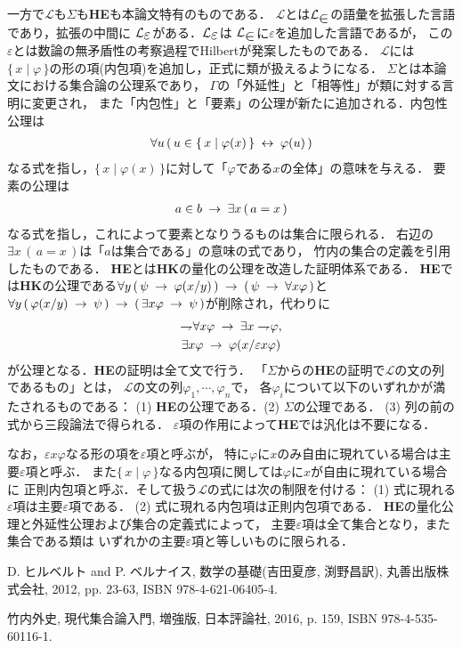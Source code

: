 \documentclass[twocolumn,10pt]{jsarticle}
\theoremstyle{mystyle}
\newcommand{\lang}[1]{\mathcal{L}_{\scalebox{1.2}{$#1$}}} %
\newcommand{\Set}[2]{\{\, #1 \mid #2\, \}} %
\newcommand{\negation}{\rightharpoondown\hspace{-0.25em}} %
\newcommand{\rarrow}{\hspace{0.25em}\rightarrow\hspace{0.25em}} %
\newcommand{\lrarrow}{\hspace{0.25em}\leftrightarrow\hspace{0.25em}} %
\begin{document}
	一方で$\mathcal{L}$も$\Sigma$も{\bf HE}も本論文特有のものである．
	$\mathcal{L}$とは$\lang{\in}$の語彙を拡張した言語であり，拡張の中間に
	$\lang{\varepsilon}$がある．$\lang{\varepsilon}$は
	$\lang{\in}$に$\varepsilon$を追加した言語であるが，
	この$\varepsilon$とは数論の無矛盾性の考察過程でHilbert\cite{Hilbert}が発案したものである．
	$\mathcal{L}$には$\Set{x}{\varphi}$の形の項(内包項)を追加し，正式に類が扱えるようになる．
	$\Sigma$とは本論文における集合論の公理系であり，
	$\Gamma$の「外延性」と「相等性」が類に対する言明に変更され，
	また「内包性」と「要素」の公理が新たに追加される．内包性公理は
	\begin{align}
		\forall u\, (\, u \in \Set{x}{\varphi(x)} \lrarrow \varphi(u)\, )
	\end{align}
	なる式を指し，$\Set{x}{\varphi(x)}$に対して「$\varphi$である$x$の全体」の意味を与える．
	要素の公理は
	\begin{align}
		a \in b \rarrow \exists x\, (\, a = x\, )
	\end{align}
	なる式を指し，これによって要素となりうるものは集合に限られる．
	右辺の$\exists x\, (\, a = x\, )$は「$a$は集合である」の意味の式であり，
	竹内\cite{TakeuchiSet}の集合の定義を引用したものである．
	{\bf HE}とは{\bf HK}の量化の公理を改造した証明体系である．
	{\bf HE}では{\bf HK}の公理である$\forall y\, (\, \psi \rarrow \varphi(x/y)\, )
	\rarrow (\, \psi \rarrow \forall x \varphi\, )$と
	$\forall y\, (\, \varphi(x/y) \rarrow \psi\, )
	\rarrow (\, \exists x \varphi \rarrow \psi\, )$が削除され，代わりに
	\begin{align}
		\begin{gathered}
			\negation \forall x \varphi \rarrow \exists x \negation \varphi, \\
			\exists x \varphi \rarrow \varphi(x/\varepsilon x \varphi)
		\end{gathered}
	\end{align}
	が公理となる．{\bf HE}の証明は全て文で行う．
	「$\Sigma$からの{\bf HE}の証明で$\mathcal{L}$の文の列であるもの」とは，
	$\mathcal{L}$の文の列$\varphi_{1},\cdots,\varphi_{n}$で，
	各$\varphi_{i}$について以下のいずれかが満たされるものである：
	(1) {\bf HE}の公理である．(2) $\Sigma$の公理である．
	(3) 列の前の式から三段論法で得られる．
	$\varepsilon$項の作用によって{\bf HE}では汎化は不要になる．
	
	なお，$\varepsilon x \varphi$なる形の項を$\varepsilon$項と呼ぶが，
	特に$\varphi$に$x$のみ自由に現れている場合は主要$\varepsilon$項と呼ぶ．
	また$\Set{x}{\varphi}$なる内包項に関しては$\varphi$に$x$が自由に現れている場合に
	正則内包項と呼ぶ．そして扱う$\mathcal{L}$の式には次の制限を付ける：
	(1) 式に現れる$\varepsilon$項は主要$\varepsilon$項である．
	(2) 式に現れる内包項は正則内包項である．
	{\bf HE}の量化公理と外延性公理および集合の定義式によって，
	主要$\varepsilon$項は全て集合となり，また集合である類は
	いずれかの主要$\varepsilon$項と等しいものに限られる．
	
	\begin{thebibliography}{数字}
		 D. ヒルベルト and P. ベルナイス, 数学の基礎(吉田夏彦, 渕野昌訳), 丸善出版株式会社, 2012, pp. 23-63, ISBN 978-4-621-06405-4.
	
		 竹内外史, 現代集合論入門, 増強版, 日本評論社, 2016, p. 159, ISBN 978-4-535-60116-1.
	\end{thebibliography}
\end{document}
